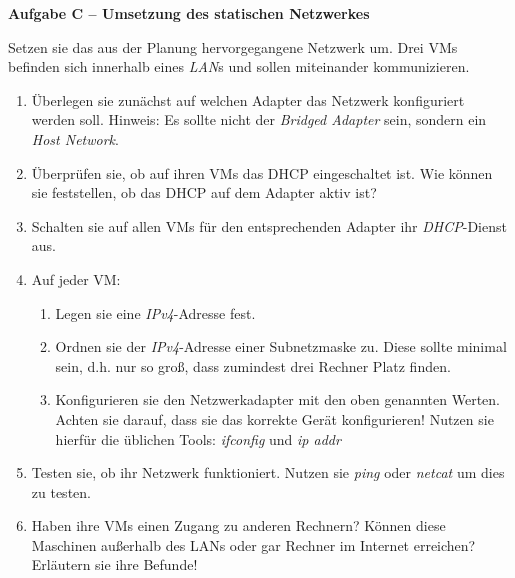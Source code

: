 \documentclass[paper=a4,fontsize=11pt]{scrartcl}%
\begin{document}
\begin{center}\Large{\textbf{Aufgabe C -- Umsetzung des statischen Netzwerkes}}\end{center}\vskip0.25in
Setzen sie das aus der Planung hervorgegangene Netzwerk um. Drei VMs befinden sich innerhalb eines \emph{LAN}s und sollen miteinander kommunizieren.
\begin{enumerate}
	\item Überlegen sie zunächst auf welchen Adapter das Netzwerk konfiguriert werden soll. Hinweis: Es sollte nicht der \emph{Bridged Adapter} sein, sondern ein \emph{Host Network}.
	\item Überprüfen sie, ob auf ihren VMs das DHCP eingeschaltet ist. Wie können sie feststellen, ob das DHCP auf dem Adapter aktiv ist?
	\item Schalten sie auf allen VMs für den entsprechenden Adapter ihr \emph{DHCP}-Dienst aus.
	\item Auf jeder VM:
	\begin{enumerate}
		\item Legen sie eine \emph{IPv4}-Adresse fest.
		\item Ordnen sie der  \emph{IPv4}-Adresse einer Subnetzmaske zu. Diese sollte minimal sein, d.h. nur so groß, dass zumindest drei Rechner Platz finden.
		\item Konfigurieren sie den Netzwerkadapter mit den oben genannten Werten. Achten sie darauf, dass sie das korrekte Gerät konfigurieren! Nutzen sie hierfür die üblichen Tools: \emph{ifconfig} und \emph{ip addr}
	\end{enumerate}
	\item Testen sie, ob ihr Netzwerk funktioniert. Nutzen sie \emph{ping} oder \emph{netcat} um dies zu testen.
	\item Haben ihre VMs einen Zugang zu anderen Rechnern? Können diese Maschinen außerhalb des LANs oder gar Rechner im Internet erreichen? Erläutern sie ihre Befunde!
\end{enumerate}
\end{document}
